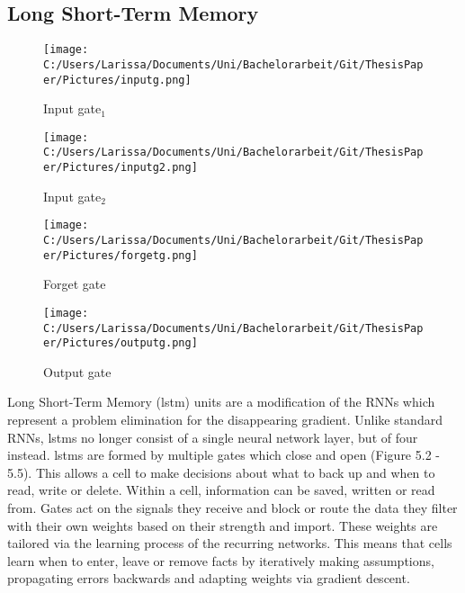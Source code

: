 \documentclass[a4paper, 11pt,titlepage,oneside,openany]{book}
\begin{document}
\subsection{Long Short-Term Memory}
\begin{figure}[h]
	\begin{minipage}[b]{0.4\textwidth}
		\texttt{[image: C:/Users/Larissa/Documents/Uni/Bachelorarbeit/Git/ThesisPaper/Pictures/inputg.png]}
		\caption{Input gate$_1$ \cite{rnn}}
	\end{minipage}
	\hfill
	\begin{minipage}[b]{0.4\textwidth}
		\texttt{[image: C:/Users/Larissa/Documents/Uni/Bachelorarbeit/Git/ThesisPaper/Pictures/inputg2.png]}
		\caption{Input gate$_2$ \cite{rnn}}
	\end{minipage}
	\begin{minipage}[b]{0.4\textwidth}
		\texttt{[image: C:/Users/Larissa/Documents/Uni/Bachelorarbeit/Git/ThesisPaper/Pictures/forgetg.png]}
		\caption{Forget gate \cite{rnn}}
	\end{minipage}
	\hfill
	\begin{minipage}[b]{0.4\textwidth}
		\texttt{[image: C:/Users/Larissa/Documents/Uni/Bachelorarbeit/Git/ThesisPaper/Pictures/outputg.png]}
		\caption{Output gate \cite{rnn}}
	\end{minipage}
\end{figure}
\noindent Long Short-Term Memory (\gls{lstm}) units \cite{lstm} are a modification of the RNNs which represent a problem elimination for the disappearing gradient. Unlike standard RNNs, \gls{lstm}s no longer consist of a single neural network layer, but of four instead. \gls{lstm}s are formed by multiple gates which close and open (Figure 5.2 - 5.5). This allows a cell to make decisions about what to back up and when to read, write or delete. Within a cell, information can be saved, written or read from. Gates act on the signals they receive and block or route the data they filter with their own weights based on their strength and import. These weights are tailored via the learning process of the recurring networks. This means that cells learn when to enter, leave or remove facts by iteratively making assumptions, propagating errors backwards and adapting weights via gradient descent.\\
\end{document}
